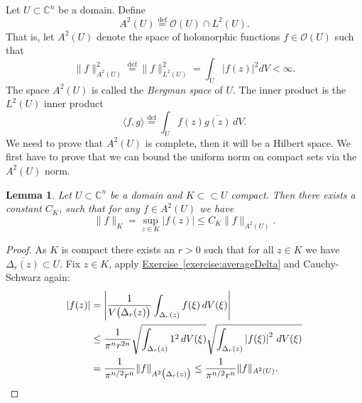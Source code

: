\documentclass[12pt,openany]{book}
\newcommand{\linnprod}[2]{\langle #1 , #2 \rangle}
\newcommand{\sabs}[1]{\lvert {#1} \rvert}
\newcommand{\snorm}[1]{\lVert {#1} \rVert}
\newcommand{\abs}[1]{\left\lvert {#1} \right\rvert}
\newcommand{\C}{{\mathbb{C}}}
\newcommand{\sO}{{\mathcal{O}}}
\newcommand{\myindex}[1]{#1\index{#1}}
\theoremstyle{plain}
\newtheorem{lemma}[thm]{Lemma}
\theoremstyle{remark}
\theoremstyle{definition}
\theoremstyle{exercise}
\theoremstyle{example}
\newcommand{\exerciseref}[1]{\hyperref[#1]{Exercise~\ref*{#1}}}
\begin{document}
Let $U \subset \C^n$ be a domain.  Define
\begin{equation*}
A^2(U) \overset{\text{def}}{=} \sO(U) \cap L^2(U) .
\end{equation*}
That is, let $A^2(U)$ denote the space
of holomorphic functions $f \in \sO(U)$ such that
\begin{equation*}
\snorm{f}_{A^2(U)}^2 \overset{\text{def}}{=} \snorm{f}_{L^2(U)}^2
= \int_U \sabs{f(z)}^2 dV < \infty .
\end{equation*}
The space $A^2(U)$ is called the
\emph{\myindex{Bergman space}} of $U$.
The inner product is the $L^2(U)$ inner product
\begin{equation*}
\linnprod{f}{g} \overset{\text{def}}{=} \int_U f(z) \overline{g(z)} \, dV .
\end{equation*}
We need to prove that $A^2(U)$ is
complete, then it will be a Hilbert space.  We first
have to prove that we can bound
the uniform norm on compact sets via the $A^2(U)$ norm.

\begin{lemma} \label{lemma:bergmanKbound}
Let $U \subset \C^n$ be a domain and $K \subset \subset U$ compact.  Then
there exists a constant $C_K$, such that for any $f\in A^2(U)$ we have
\begin{equation*}
\snorm{f}_K
=
\sup_{z \in K} \sabs{f(z)} 
\leq C_K \snorm{f}_{A^2(U)} .
\end{equation*}
\end{lemma}

\begin{proof}
As $K$ is compact there exists an $r > 0$ such that for all $z \in K$
we have $\overline{\Delta_r(z)} \subset U$.  Fix $z \in K$,
apply \exerciseref{exercise:averageDelta} and Cauchy-Schwarz again:
\begin{equation*}
\begin{split}
\abs{f(z)} &=
\abs{\frac{1}{V\bigl(\Delta_r(z)\bigr)} \int_{\Delta_r(z)} f(\xi) \,
dV(\xi)}
\\
& \leq
\frac{1}{\pi^n r^{2n}}
\sqrt{\int_{\Delta_r(z)} 1^2 \, dV(\xi)}
\sqrt{\int_{\Delta_r(z)} \abs{f(\xi)}^2 \, dV(\xi)}
\\
& =
\frac{1}{\pi^{n/2} r^n}
\snorm{f}_{A^2\bigl(\Delta_r(z)\bigr)} 
\leq
\frac{1}{\pi^{n/2} r^n}
\snorm{f}_{A^2(U)} . \qedhere
\end{split}
\end{equation*}
\end{proof}
\end{document}

